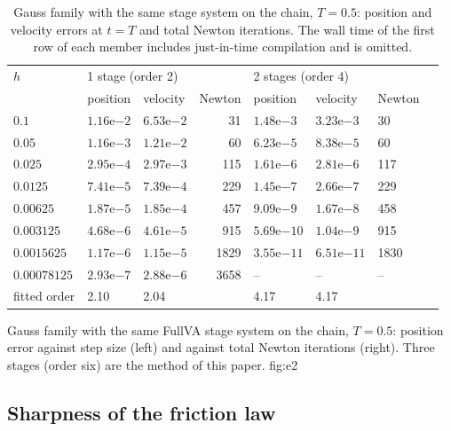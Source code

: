 \begin{table}[!htb]
\centering
\caption{Gauss family with the same stage system on the chain, $T=0.5$: position and velocity
errors at $t=T$ and total Newton iterations. The wall time of the first row of each member includes
just-in-time compilation and is omitted.}
\label{tab:e2}
\scriptsize
\setlength{\tabcolsep}{3pt}
\begin{tabular}{@{}lllrlllr@{}}
\toprule
$h$ & \multicolumn{3}{l}{1 stage (order 2)} & \multicolumn{3}{l}{2 stages (order 4)} & \\
    & position & velocity & Newton & position & velocity & Newton & \\
\midrule
$0.1$      & $1.16\mathrm{e}{-2}$ & $6.53\mathrm{e}{-2}$ & 31   & $1.48\mathrm{e}{-3}$ & $3.23\mathrm{e}{-3}$ & 30 & \\
$0.05$     & $1.16\mathrm{e}{-3}$ & $1.21\mathrm{e}{-2}$ & 60   & $6.23\mathrm{e}{-5}$ & $8.38\mathrm{e}{-5}$ & 60 & \\
$0.025$    & $2.95\mathrm{e}{-4}$ & $2.97\mathrm{e}{-3}$ & 115  & $1.61\mathrm{e}{-6}$ & $2.81\mathrm{e}{-6}$ & 117 & \\
$0.0125$   & $7.41\mathrm{e}{-5}$ & $7.39\mathrm{e}{-4}$ & 229  & $1.45\mathrm{e}{-7}$ & $2.66\mathrm{e}{-7}$ & 229 & \\
$0.00625$  & $1.87\mathrm{e}{-5}$ & $1.85\mathrm{e}{-4}$ & 457  & $9.09\mathrm{e}{-9}$ & $1.67\mathrm{e}{-8}$ & 458 & \\
$0.003125$ & $4.68\mathrm{e}{-6}$ & $4.61\mathrm{e}{-5}$ & 915  & $5.69\mathrm{e}{-10}$ & $1.04\mathrm{e}{-9}$ & 915 & \\
$0.0015625$ & $1.17\mathrm{e}{-6}$ & $1.15\mathrm{e}{-5}$ & 1829 & $3.55\mathrm{e}{-11}$ & $6.51\mathrm{e}{-11}$ & 1830 & \\
$0.00078125$ & $2.93\mathrm{e}{-7}$ & $2.88\mathrm{e}{-6}$ & 3658 & -- & -- & -- & \\
\midrule
fitted order & 2.10 & 2.04 & & 4.17 & 4.17 & & \\
\bottomrule
\end{tabular}
\end{table}

{Gauss family with the same FullVA stage system on the chain, $T=0.5$: position error against step
size (left) and against total Newton iterations (right). Three stages (order six) are the method of
this paper.}
{fig:e2}

\subsection{Sharpness of the friction law}
\label{sec:e3}


